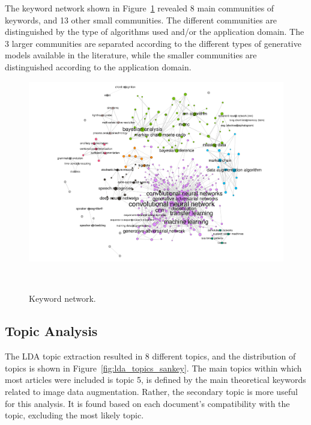 \documentclass[parskip=full]{scrartcl}
\begin{document}
The keyword network shown in Figure~\ref{fig:keyword_network} revealed 8 main
communities of keywords, and 13 other small communities. The different
communities are distinguished by the type of algorithms used and/or the
application domain. The 3 larger communities are separated according to the
different types of generative models available in the literature, while the
smaller communities are distinguished according to the application domain.

\begin{figure}[H]
	\centering
    \includegraphics[width=\linewidth]{../analysis/keyword_network}
    \caption{Keyword network.
    }~\label{fig:keyword_network}
\end{figure}



\subsection{Topic Analysis}

The LDA topic extraction resulted in 8 different topics, and the distribution
of topics is shown in Figure~\ref{fig:lda_topics_sankey}. The main topics
within which most articles were included is topic 5, is defined by the
main theoretical keywords related to image data augmentation. Rather, the
secondary topic is more useful for this analysis. It is found based on each
document's compatibility with the topic, excluding the most likely topic.
\end{document}
